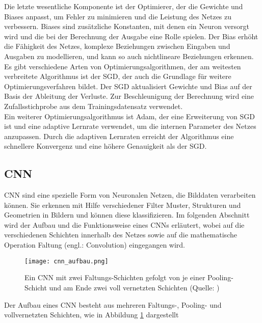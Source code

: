 Die letzte wesentliche Komponente ist der Optimierer, der die Gewichte und Biases anpasst, um Fehler zu minimieren und die Leistung des Netzes zu verbessern. Biases sind zusätzliche Konstanten, mit denen ein Neuron versorgt wird und die bei der Berechnung der Ausgabe eine Rolle spielen. Der Bias erhöht die Fähigkeit des Netzes, komplexe Beziehungen zwischen Eingaben und Ausgaben zu modellieren, und kann so auch nichtlineare Beziehungen erkennen. \\
Es gibt verschiedene Arten von Optimierungsalgorithmen, der am weitesten verbreitete Algorithmus ist der \ac{SGD}, der auch die Grundlage für weitere Optimierungsverfahren bildet. Der \ac{SGD} aktualisiert Gewichte und Bias auf der Basis der Ableitung der Verluste. Zur Beschleunigung der Berechnung wird eine Zufallsstichprobe aus dem Trainingsdatensatz verwendet. \cite[vgl.][]{Goodfellow2016} \\
Ein weiterer Optimierungsalgorithmus ist Adam, der eine Erweiterung von \ac{SGD} ist und eine adaptive Lernrate verwendet, um die internen Parameter des Netzes anzupassen. Durch die adaptiven Lernraten erreicht der Algorithmus eine schnellere Konvergenz und eine höhere Genauigkeit als der \ac{SGD}. \cite[vgl.][]{Kingma2014}

\subsection{\acf{CNN}}
\acf{CNN} sind eine spezielle Form von Neuronalen Netzen, die Bilddaten verarbeiten können. Sie erkennen mit Hilfe verschiedener Filter Muster, Strukturen und Geometrien in Bildern und können diese klassifizieren. Im folgenden Abschnitt wird der Aufbau und die Funktionsweise eines \ac{CNN}s erläutert, wobei auf die verschiedenen Schichten innerhalb des Netzes sowie auf die mathematische Operation Faltung (engl.: Convolution) eingegangen wird.

\begin{figure}[ht]
	\centering
	\texttt{[image: cnn\_aufbau.png]}
	\caption{Ein \ac{CNN} mit zwei Faltungs-Schichten gefolgt von je einer Pooling-Schicht und am Ende
		zwei voll vernetzten Schichten (Quelle: \cite{Ertel2021})}	
	\label{fig:cnn_aufbau}
\end{figure}

Der Aufbau eines \ac{CNN} besteht aus mehreren Faltungs-, Pooling- und vollvernetzten Schichten, wie in Abbildung \ref{fig:cnn_aufbau} dargestellt

